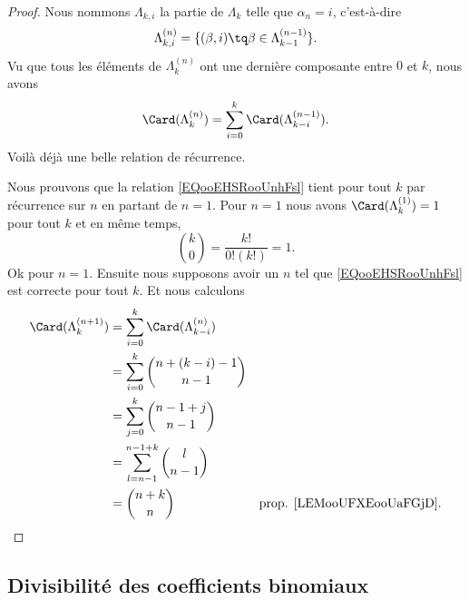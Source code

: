 \begin{proof}
	Nous nommons \( \Lambda_{k,i}\) la partie de \( \Lambda_k\) telle que \( \alpha_n=i\), c'est-à-dire
	\begin{equation}
		\Lambda_{k,i}^{(n)}=\{ (\beta,i)\tq \beta\in\Lambda_{k-1}^{(n-1)} \}.
	\end{equation}
	Vu que tous les éléments de \( \Lambda_k^{(n)}\) ont une dernière composante entre \( 0\) et \( k\), nous avons
	\begin{equation}
		\Card(\Lambda_k^{(n)})=\sum_{i=0}^k\Card(\Lambda_{k-i}^{(n-1)}).
	\end{equation}
	Voilà déjà une belle relation de récurrence.

	Nous prouvons que la relation \eqref{EQooEHSRooUnhFsl} tient pour tout \( k\) par récurrence sur \( n\) en partant de \( n=1\). Pour \( n=1\) nous avons \( \Card(\Lambda_k^{(1)})=1\) pour tout \( k\) et en même temps,
	\begin{equation}
		\binom{ k }{ 0 }=\frac{ k! }{ 0!(k!) }=1.
	\end{equation}
	Ok pour \( n=1\). Ensuite nous supposons avoir un \( n\) tel que \eqref{EQooEHSRooUnhFsl} est correcte pour tout \( k\). Et nous calculons
	\begin{subequations}
		\begin{align}
			\Card(\Lambda_k^{(n+1)}) & =\sum_{i=0}^k\Card(\Lambda_{k-i}^{(n)})                                         \\
			                         & =\sum_{i=0}^k\binom{ n+(k-i)-1 }{ n-1 }                                         \\
			                         & =\sum_{j=0}^k\binom{ n-1+j }{ n-1 }                                             \\
			                         & =\sum_{l=n-1}^{n-1+k}\binom{ l }{ n-1 }                                         \\
			                         & =\binom{ n+k }{ n }                     & \text{prop. \ref{LEMooUFXEooUaFGjD}}.
		\end{align}
	\end{subequations}
\end{proof}

\subsection{Divisibilité des coefficients binomiaux}

